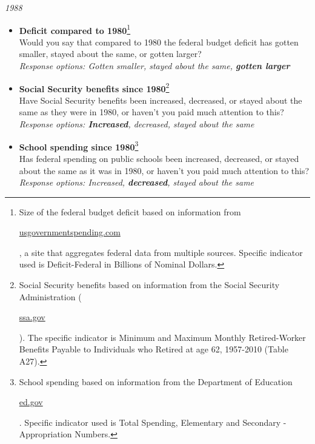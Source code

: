 \documentclass[12pt, letterpaper]{article}
\begin{document}
\vspace{.2in}
\large \noindent\textit{1988}

\vspace{2mm}

\normalsize
\begin{itemize}
\item \textbf{Deficit compared to 1980}\footnote{Size of the federal budget deficit based on information from \begin{footnotesize} \url{usgovernmentspending.com} \end{footnotesize}, a site that aggregates federal data from multiple sources. Specific indicator used is Deficit-Federal in Billions of Nominal Dollars.}   \\
Would you say that compared to 1980 the federal budget deficit has gotten smaller, stayed about the same, or gotten larger? \\
\textit{Response options: Gotten smaller, stayed about the same, \textbf{gotten larger}} 
\end{itemize}

\begin{itemize}
\item \textbf{Social Security benefits since 1980}\footnote{Social Security benefits based on information from the Social Security Administration (\begin{footnotesize}\url{ssa.gov}\end{footnotesize}). The specific indicator is Minimum and Maximum Monthly Retired-Worker Benefits Payable to Individuals who Retired at age 62, 1957-2010 (Table A27).}   \\
Have Social Security benefits been increased, decreased, or stayed about the same as they were in 1980, or haven't you paid much attention to this? \\
\textit{Response options: \textbf{Increased}, decreased, stayed about the same} 
\end{itemize}

\begin{itemize}
\item \textbf{School spending since 1980}\footnote{School spending based on information from the Department of Education \begin{footnotesize}\url{ed.gov}\end{footnotesize}. Specific indicator used is Total Spending, Elementary and Secondary - Appropriation Numbers.}   \\
Has federal spending on public schools been increased, decreased, or stayed about the same as it was in 1980, or haven't you paid much attention to this? \\
\textit{Response options: Increased, \textbf{decreased}, stayed about the same} 
\end{itemize}
\end{document}
